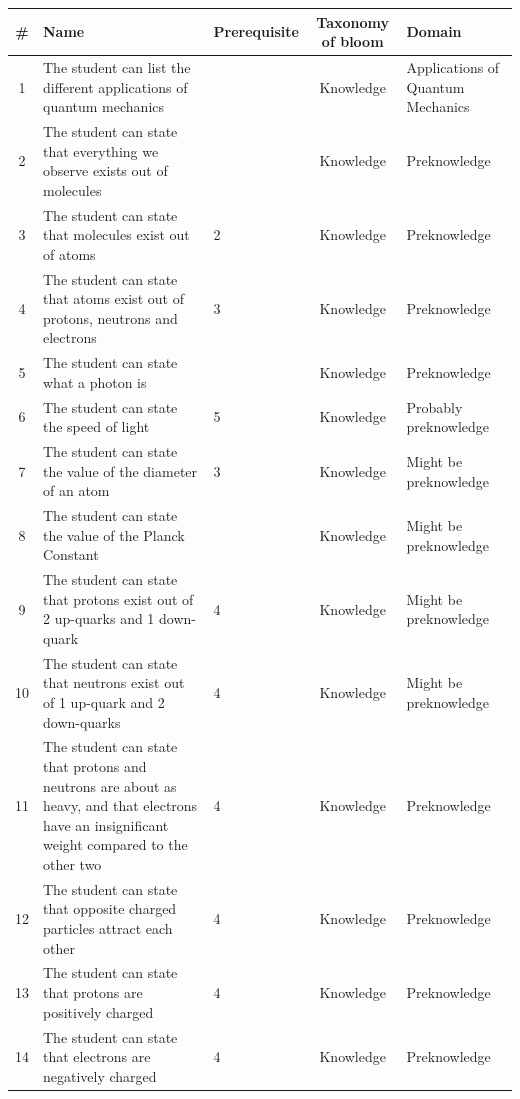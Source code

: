 \documentclass[11pt,twoside]{report} %
\begin{document}
\begin{table}[htbp]
\small
\begin{center}
\begin{tabular}{|c|p{5cm}|p{1.5cm}|c|p{3cm}|}
\hline
\textbf{\#} & \textbf{Name} & \textbf{\footnotesize Prerequisite} & \textbf{Taxonomy of bloom} & \textbf{Domain} \\ \hline
1 & The student can list the different applications of quantum mechanics &  & Knowledge & Applications of Quantum Mechanics \\ \hline
2 & The student can state that everything we observe exists out of molecules &  & Knowledge & Preknowledge \\ \hline
3 & The student can state that molecules exist out of atoms & 2 & Knowledge & Preknowledge \\ \hline
4 & The student can state that atoms exist out of protons, neutrons and electrons & 3 & Knowledge & Preknowledge \\ \hline
5 & The student can state what a photon is &  & Knowledge & Preknowledge \\ \hline
6 & The student can state the speed of light & 5 & Knowledge & Probably preknowledge \\ \hline
7 & The student can state the value of the diameter of an atom & 3 & Knowledge & Might be preknowledge \\ \hline
8 & The student can state the value of the Planck Constant &  & Knowledge & Might be preknowledge \\ \hline
9 & The student can state that protons exist out of 2 up-quarks and 1 down-quark & 4 & Knowledge & Might be preknowledge \\ \hline
10 & The student can state that neutrons exist out of 1 up-quark and 2 down-quarks & 4 & Knowledge & Might be preknowledge \\ \hline
11 & The student can state that protons and neutrons are about as heavy, and that electrons have an insignificant weight compared to the other two & 4 & Knowledge & Preknowledge \\ \hline
12 & The student can state that opposite charged particles attract each other & 4 & Knowledge & Preknowledge \\ \hline
13 & The student can state that protons are positively charged & 4 & Knowledge & Preknowledge \\ \hline
14 & The student can state that electrons are negatively charged & 4 & Knowledge & Preknowledge \\ \hline
\end{tabular}
\end{center}
\label{completeoutline}
\end{table}
\end{document}
